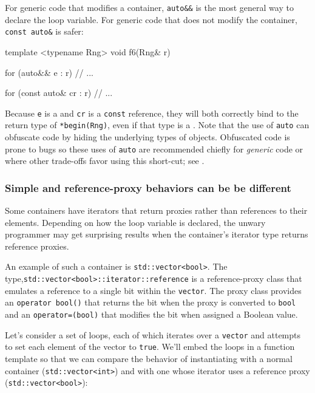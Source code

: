 {{{For generic code that modifies a container, \lstinline!auto&&! is the
most general way to declare the loop variable. For generic code that
does not modify the container, \lstinline!const!~\lstinline!auto&! is safer:

\begin{emcppslisting}[emcppsbatch=e5]
template <typename Rng>
void f6(Rng& r)
{
    for (auto&& e : r)
    {
        // ...
    }

    for (const auto& cr : r)
    {
        // ...
    }
}
\end{emcppslisting}


\noindent Because \lstinline!e! is a  and \lstinline!cr! is
a \lstinline!const! reference, they will both correctly bind to the return
type of \lstinline!*begin(Rng)!, even if that type is a .
Note that the use of \lstinline!auto! can obfuscate code by hiding the
underlying types of objects. Obfuscated code is prone to bugs so these
uses of \lstinline!auto! are recommended chiefly for \emph{generic} code or
where other trade-offs favor using this short-cut; see .

\subsubsection[Simple and reference-proxy behaviors can be be different]{Simple and reference-proxy behaviors can be be different}\label{simple-and-reference-proxy-behaviors-can-be-be-different}

Some containers have iterators that return proxies rather than
references to their elements. Depending on how the loop variable is
declared, the unwary programmer may get surprising results when the
container's iterator type returns reference proxies.

An example of such a container is \lstinline!std::vector<bool>!. The type,\linebreak[4]
\lstinline!std::vector<bool>::iterator::reference! is a reference-proxy
class that emulates a reference to a single bit within the
\lstinline!vector!. The proxy class provides an
\lstinline!operator!~\lstinline!bool()! that returns the bit when the proxy is
converted to \lstinline!bool! and an \lstinline!operator=(bool)! that modifies
the bit when assigned a Boolean value.

Let's consider a set of loops, each of which iterates over a
\lstinline!vector! and attempts to set each element of the vector to
\lstinline!true!. We'll embed the loops in a function template so that we
can compare the behavior of instantiating with a normal container
(\lstinline!std::vector<int>!) and with one whose iterator uses a reference
proxy (\lstinline!std::vector<bool>!):

}}}
